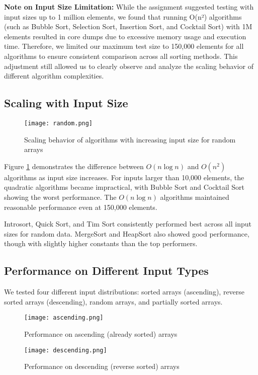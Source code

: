 \documentclass[sigconf]{acmart}
\begin{document}
\textbf{Note on Input Size Limitation:} While the assignment suggested testing with input sizes up to 1 million elements, we found that running O(n²) algorithms (such as Bubble Sort, Selection Sort, Insertion Sort, and Cocktail Sort) with 1M elements resulted in core dumps due to excessive memory usage and execution time. Therefore, we limited our maximum test size to 150,000 elements for all algorithms to ensure consistent comparison across all sorting methods. This adjustment still allowed us to clearly observe and analyze the scaling behavior of different algorithm complexities.

\subsection{Scaling with Input Size}

\begin{figure}[h]
  \centering
  \texttt{[image: random.png]}
  \caption{Scaling behavior of algorithms with increasing input size for random arrays}
  \label{fig:scaling}
\end{figure}

Figure \ref{fig:scaling} demonstrates the difference between $O(n \log n)$ and $O(n^2)$ algorithms as input size increases. For inputs larger than 10,000 elements, the quadratic algorithms became impractical, with Bubble Sort and Cocktail Sort showing the worst performance. The $O(n \log n)$ algorithms maintained reasonable performance even at 150,000 elements.

Introsort, Quick Sort, and Tim Sort consistently performed best across all input sizes for random data. MergeSort and HeapSort also showed good performance, though with slightly higher constants than the top performers.

\subsection{Performance on Different Input Types}
We tested four different input distributions: sorted arrays (ascending), reverse sorted arrays (descending), random arrays, and partially sorted arrays.

\begin{figure*}[t]
  \centering
  \begin{minipage}{0.48\textwidth}
    \texttt{[image: ascending.png]}
    \caption{Performance on ascending (already sorted) arrays}
    \label{fig:ascending}
  \end{minipage}
  \hfill
  \begin{minipage}{0.48\textwidth}
    \texttt{[image: descending.png]}
    \caption{Performance on descending (reverse sorted) arrays}
    \label{fig:descending}
  \end{minipage}
\end{figure*}
\end{document}
